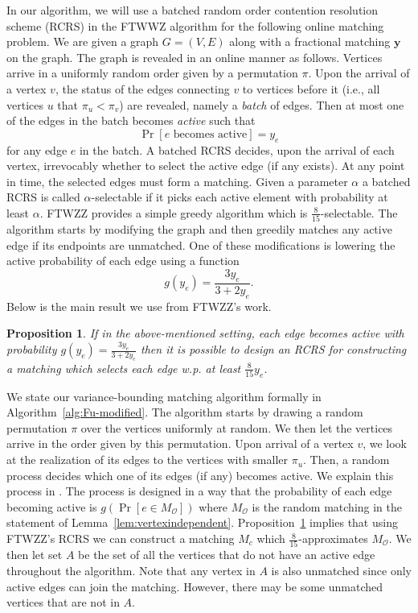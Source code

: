 \documentclass[letterpaper,11pt]{article}
\makeatletter
\newcommand{\mc}[1]{\ensuremath{\mathcal{#1}}}
\newtheorem{proposition}[lemma]{Proposition}
\renewcommand{\mc}[1]{\ensuremath{\mathcal{#1}}}
\renewcommand{\paragraph}{\@startsection{paragraph}{4}{\z@}{10pt}{-1em}{\normalfont\normalsize\bfseries}}
\makeatother
\begin{document}
\paragraph{Batched RCRS:} \label{sec:Fualgorithm} In our algorithm, we will use a batched  random order contention
resolution scheme (RCRS) in the FTWWZ algorithm for the following online matching problem. We are given a graph $G=(V,E)$ along with a fractional matching $\bm{y}$ on the graph. The graph is revealed in an online manner as follows.  Vertices arrive in a uniformly random order given by a permutation $\pi$. Upon the arrival of a vertex $v$, the status of the edges connecting $v$ to vertices before it (i.e., all vertices $u$ that $\pi_u < \pi_v$)  are revealed, namely a \emph{batch} of edges. 
Then at most one of the edges in the batch becomes \emph{active} such that $$\Pr[e \text{ becomes active}] =  y_e$$ for any edge $e$ in  the batch. A batched RCRS decides, upon the arrival of each vertex, irrevocably whether to select the active edge (if any exists). At any point in time, the selected edges must form a matching. Given a parameter $\alpha$ a batched RCRS is called $\alpha$-selectable if it picks each active element with probability at least $\alpha$. FTWZZ provides a simple greedy algorithm which is $\frac{8}{15}$-selectable. The algorithm starts by  modifying the graph and then greedily matches any active edge if its endpoints are unmatched. One of these modifications is lowering the active probability of each edge using a function \begin{equation}\label{g(yv)}
    g(y_e)=\frac{3y_e}{3+2y_e}.
\end{equation} Below is the main result we use from FTWZZ's work.

\begin{proposition}\label{prop:fu}
   If in the above-mentioned setting, each edge becomes active with probability $g(y_e)=\frac{3y_e}{3+2y_e}$ then it is possible to design an RCRS for constructing a matching which selects each edge w.p. at least $\frac{8}{15}y_e$.
\end{proposition}


We state our variance-bounding matching algorithm formally in Algorithm~\ref{alg:Fu-modified}. The  algorithm starts by drawing a  random permutation $\pi$ over the vertices uniformly at random. We then let the vertices arrive in the order given by this permutation. Upon arrival of a vertex $v$, we look at the realization of its edges to the vertices with smaller $\pi_u$. Then, a random process decides which one of its edges (if any) becomes active. We explain  this process in . The process is designed in a way that the probability of each edge becoming active is $g(\Pr[e\in M_{\mc{O}}])$ where $M_{\mc{O}}$ is the random matching in the statement of Lemma~\ref{lem:vertexindependent}. Proposition~\ref{prop:fu} implies that using  FTWZZ's RCRS we can  construct a matching $M_c$ which $\frac{8}{15}$-approximates  $M_{\mc{O}}$. We then let set $A$ be the set of all the vertices that do not have an active edge throughout the algorithm. Note that any vertex in $A$ is also unmatched since only active edges can join  the matching. However, there may be some unmatched vertices that are not in $A$.
\end{document}
